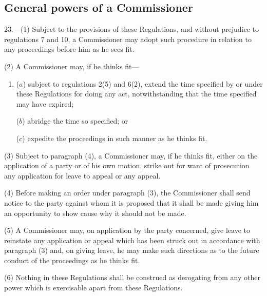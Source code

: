 \documentclass[a4paper]{article}
\begin{document}
\subsection[23. General powers of a Commissioner]{General powers of a Commissioner}

23.—(1) Subject to the provisions of these Regulations, and without prejudice to regulations 7 and 10, a Commissioner may adopt such procedure in relation to any proceedings before him as he sees fit.

(2) A Commissioner may, if he thinks fit—
\begin{enumerate}\item[]
($a$) subject to regulations 2(5) and 6(2), extend the time specified by or under these Regulations for doing any act, notwithstanding that the time specified may have expired;

($b$) abridge the time so specified; or

($c$) expedite the proceedings in such manner as he thinks fit.
\end{enumerate}

(3) Subject to paragraph (4), a Commissioner may, if he thinks fit, either on the application of a party or of his own motion, strike out for want of prosecution any application for leave to appeal or any appeal.

(4) Before making an order under paragraph (3), the Commissioner shall send notice to the party against whom it is proposed that it shall be made giving him an opportunity to show cause why it should not be made.

(5) A Commissioner may, on application by the party concerned, give leave to reinstate any application or appeal which has been struck out in accordance with paragraph (3) and, on giving leave, he may make such directions as to the future conduct of the proceedings as he thinks fit.

(6) Nothing in these Regulations shall be construed as derogating from any other power which is exercisable apart from these Regulations.
\end{document}
